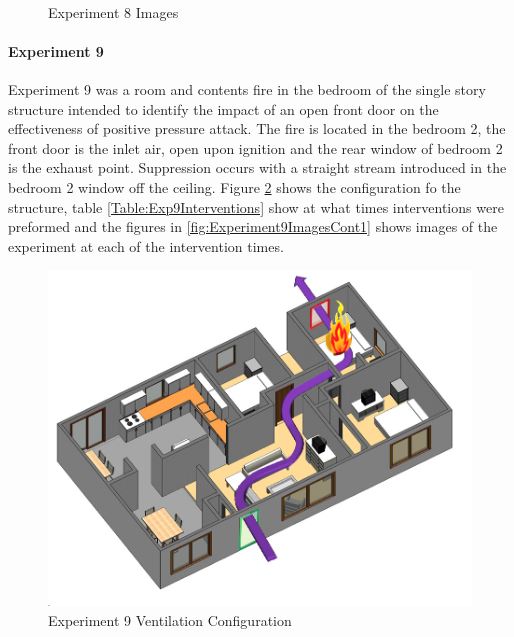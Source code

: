 \documentclass{article}
\begin{document}
\begin{figure}[H]
	\ContinuedFloat 
	\centering 
	 \ 
	\caption{Experiment 8 Images}
	\label{fig:Experiment8ImagesCont3} 
\end{figure}

\paragraph{Experiment 9}\mbox{}

Experiment 9 was a room and contents fire in the bedroom of the single story structure intended to identify the impact of an open front door on the effectiveness of positive pressure attack. The fire is located in the bedroom 2, the front door is the inlet air, open upon ignition and the rear window of bedroom 2 is the exhaust point. Suppression occurs with a straight stream introduced in the bedroom 2 window off the ceiling. Figure \ref{fig:Exp9VentConfig} shows the configuration fo the structure, table \ref{Table:Exp9Interventions} show at what times interventions were preformed and the figures in \ref{fig:Experiment9ImagesCont1} shows images of the experiment at each of the intervention times.

\begin{figure}[h!]
	\centering
	\includegraphics[width=5in]{0_Images/FireExperiments/Single_Story/Experiment_9.jpg}
	\caption{Experiment 9 Ventilation Configuration}
	\label{fig:Exp9VentConfig}
\end{figure}
\end{document}
